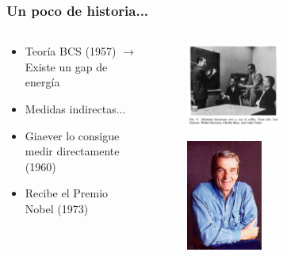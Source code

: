 \frame{\tableofcontents}

\begin{frame}
\frametitle{Un poco de historia...}

\begin{columns}
\begin{column}{0.5\textwidth}
	\begin{itemize}[<+->]
		\item{Teor\'ia BCS (1957) $\longrightarrow$ Existe un gap de energ\'ia}
		\item{Medidas indirectas...}
		\item{Giaever lo consigue medir directamente (1960)}
		\item{Recibe el Premio Nobel (1973)}
	\end{itemize}
\end{column}
\begin{column}{0.5\textwidth}
	\begin{figure}[!h] \label{giaever60}
	\includegraphics[width=0.5\textwidth]{giaever60}
	\end{figure}
	\begin{figure}[!h] \label{giaever99}
	\includegraphics[width=0.4\textwidth]{giaever99}
	\end{figure}
\end{column}
\end{columns}

\end{frame}
